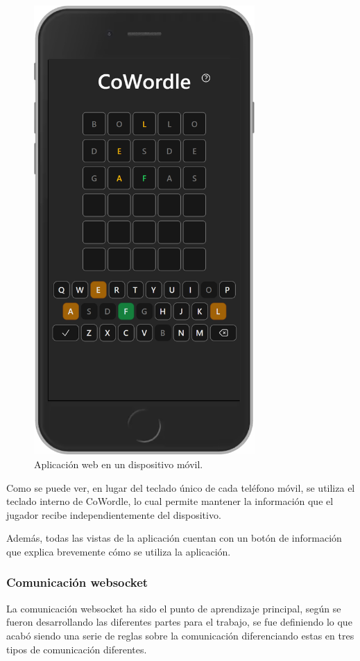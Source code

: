 \begin{figure}[H]
	\centering
	\includegraphics[clip=true,width=0.75\textwidth]{./images/design/cowordle_iphone.png}
	\caption{Aplicación web en un dispositivo móvil.}
	\label{fig:web_iphone}
\end{figure}

Como se puede ver, en lugar del teclado único de cada teléfono móvil, se utiliza el teclado interno de CoWordle, lo cual permite mantener la información que el jugador recibe independientemente del dispositivo.

Además, todas las vistas de la aplicación cuentan con un botón de información que explica brevemente cómo se utiliza la aplicación.


\subsubsection{Comunicación websocket}
La comunicación websocket ha sido el punto de aprendizaje principal, según se fueron desarrollando las diferentes partes para el trabajo, se fue definiendo lo que acabó siendo una serie de reglas sobre la comunicación diferenciando estas en tres tipos de comunicación diferentes.


